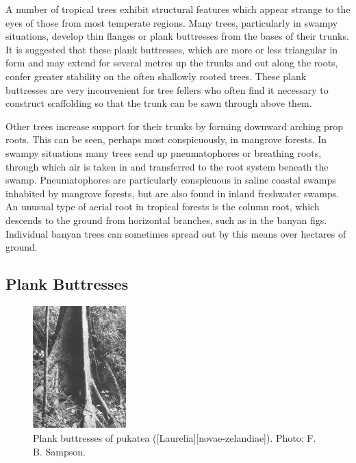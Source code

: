 A number of tropical trees exhibit structural features which appear strange to the eyes of those from most temperate regions.
Many trees, particularly in swampy situations, develop thin flanges or plank buttresses from the bases of their trunks.
It is suggested that these plank buttresses, which are more or less triangular in form and may extend for several metres up the trunks and out along the roots, confer greater stability on the often shallowly rooted trees.
These plank buttresses are very inconvenient for tree fellers who often find it necessary to construct scaffolding so that the trunk can be sawn through above them.

Other trees increase support for their trunks by forming downward arching prop roots.
This can be seen, perhaps most conspicuously, in mangrove forests.
In swampy situations many trees send up pneumatophores or breathing roots, through which air is taken in and transferred to the root system beneath the swamp.
Pneumatophores are particularly conspicuous in saline coastal swamps inhabited by mangrove forests, but are also found in inland freshwater swamps.
An unusual type of aerial root in tropical forests is the column root, which descends to the ground from horizontal branches, such as in the banyan figs.
Individual banyan trees can sometimes spread out by this means over hectares of ground.

\subsection{Plank Buttresses}

\begin{figure}
	\centering
	\includegraphics[width=0.32\textwidth]{graphics/figure9buttresses.jpg}
	\caption[Plank buttresses of pukatea]{Plank buttresses of pukatea ([Laurelia][novae-zelandiae]).
	Photo:  F. B. Sampson.}%
	\label{fig:9buttresses}
\end{figure}

